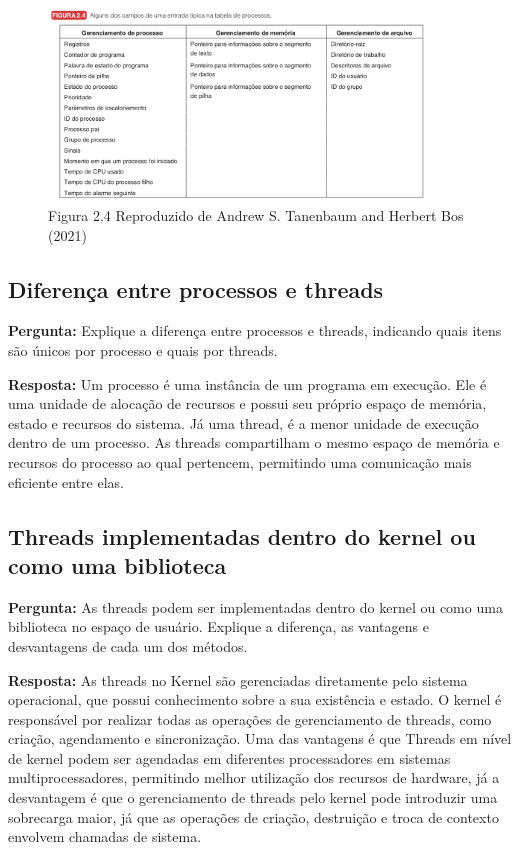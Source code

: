 \documentclass{article}
\begin{document}
\begin{figure}[h] %
    \centering %
    \includegraphics[width=0.9\textwidth]{Images/Captura de tela de 2024-10-18 15-19-09.png}
    \caption{Figura 2.4 Reproduzido de Andrew S. Tanenbaum and Herbert Bos (2021) \cite{tanenbaum2021}}
    \label{fig:2} %
\end{figure}
\newpage

\subsection{Diferença entre processos e threads}
\textbf{Pergunta:} Explique a diferença entre processos e threads, indicando quais itens são únicos por processo e quais por threads.\newline

\textbf{Resposta:} Um processo é uma instância de um programa em execução. Ele é uma unidade de alocação de recursos e possui seu próprio espaço de memória, estado e recursos do sistema. Já uma thread, é a menor unidade de execução dentro de um processo. As threads compartilham o mesmo espaço de memória e recursos do processo ao qual pertencem, permitindo uma comunicação mais eficiente entre elas.

\subsection{Threads implementadas dentro do kernel ou como uma biblioteca}
\textbf{Pergunta:} As threads podem ser implementadas dentro do kernel ou como uma biblioteca no espaço de usuário. Explique a diferença, as vantagens e desvantagens de cada um dos métodos.\newline

\textbf{Resposta:} As threads no Kernel são gerenciadas diretamente pelo sistema operacional, que possui conhecimento sobre a sua existência e estado. O kernel é responsável por realizar todas as operações de gerenciamento de threads, como criação, agendamento e sincronização. Uma das vantagens é que Threads em nível de kernel podem ser agendadas em diferentes processadores em sistemas multiprocessadores, permitindo melhor utilização dos recursos de hardware, já a desvantagem é que o gerenciamento de threads pelo kernel pode introduzir uma sobrecarga maior, já que as operações de criação, destruição e troca de contexto envolvem chamadas de sistema.
\end{document}
